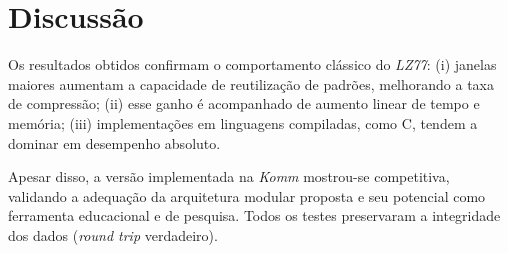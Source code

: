 \section{Discussão}

Os resultados obtidos confirmam o comportamento clássico do \textit{LZ77}:  
(i) janelas maiores aumentam a capacidade de reutilização de padrões, melhorando a taxa de compressão;  
(ii) esse ganho é acompanhado de aumento linear de tempo e memória;  
(iii) implementações em linguagens compiladas, como C, tendem a dominar em desempenho absoluto.  

Apesar disso, a versão implementada na \textit{Komm} mostrou-se competitiva, validando a adequação da arquitetura modular proposta e seu potencial como ferramenta educacional e de pesquisa.  
Todos os testes preservaram a integridade dos dados (\emph{round trip} verdadeiro).
